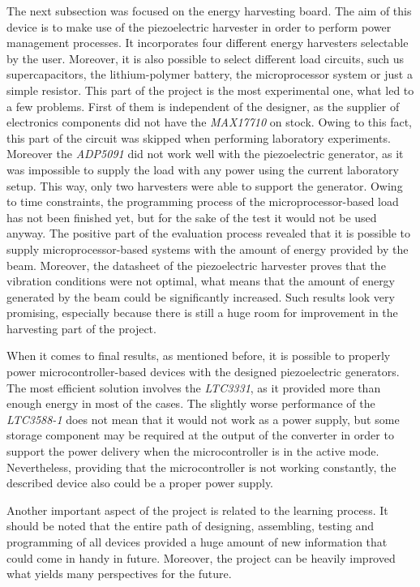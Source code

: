 \documentclass[12pt,a4paper]{article}
\begin{document}
The next subsection was focused on the energy harvesting board. The aim of this device is to make use of the piezoelectric harvester in order to perform power management processes. It incorporates four different energy harvesters selectable by the user. Moreover, it is also possible to select different load circuits, such us supercapacitors, the lithium-polymer battery, the microprocessor system or just a simple resistor. This part of the project is the most experimental one, what led to a few problems. First of them is independent of the designer, as the supplier of electronics components did not have the \textit{MAX17710} on stock. Owing to this fact, this part of the circuit was skipped when performing laboratory experiments. Moreover the \textit{ADP5091} did not work well with the piezoelectric generator, as it was impossible to supply the load with any power using the current laboratory setup. This way, only two harvesters were able to support the generator. Owing to time constraints, the programming process of the microprocessor-based load has not been finished yet, but for the sake of the test it would not be used anyway. The positive part of the evaluation process revealed that it is possible to supply microprocessor-based systems with the amount of energy provided by the beam. Moreover, the datasheet of the piezoelectric harvester \cite{PPA} proves that the vibration conditions were not optimal, what means that the amount of energy generated by the beam could be significantly increased. Such results look very promising, especially because there is still a huge room for improvement in the harvesting part of the project.
\par
When it comes to final results, as mentioned before, it is possible to properly power microcontroller-based devices with the designed piezoelectric generators. The most efficient solution involves the \textit{LTC3331}, as it provided more than enough energy in most of the cases. The slightly worse performance of the \textit{LTC3588-1} does not mean that it would not work as a power supply, but some storage component may be required at the output of the converter in order to support the power delivery when the microcontroller is in the active mode. Nevertheless, providing that the microcontroller is not working constantly, the described device also could be a proper power supply.
\par
Another important aspect of the project is related to the learning process. It should be noted that the entire path of designing, assembling, testing and programming of all devices provided a huge amount of new information that could come in handy in future. Moreover, the project can be heavily improved what yields many perspectives for the future.
\end{document}
